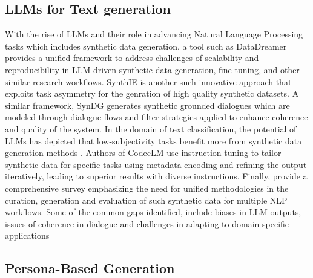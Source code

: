 \documentclass[11pt]{article}
\begin{document}
\subsection{LLMs for Text generation}

With the rise of LLMs and their role in advancing Natural Language Processing tasks which includes synthetic data generation, a tool such as DataDreamer \citep{patel-etal-2024-datadreamer} provides a unified framework to address challenges of scalability and reproducibility in LLM-driven synthetic data generation, fine-tuning, and other similar research workflows. SynthIE \citep{josifoski-etal-2023-exploiting} is another such innovative approach that exploits task asymmetry for the genration of high quality synthetic datasets. A similar framework, SynDG \citep{bao-etal-2023-synthetic} generates synthetic grounded dialogues which are modeled through dialogue flows and filter strategies applied to enhance coherence and quality of the system. In the domain of text classification, the potential of LLMs has depicted that low-subjectivity tasks benefit more from synthetic data generation methods \citep{li-etal-2023-synthetic}.  Authors of CodecLM use instruction tuning to tailor synthetic data for specific tasks using metadata encoding and refining the output iteratively, leading to superior results with diverse instructions. Finally, \citep{long-etal-2024-llms} provide a comprehensive survey emphasizing the need for unified methodologies in the curation, generation and evaluation of such synthetic data for multiple NLP workflows. Some of the common gaps identified, include biases in LLM outputs, issues of coherence in dialogue and challenges in adapting to domain specific applications 

\subsection{Persona-Based Generation}
\end{document}
